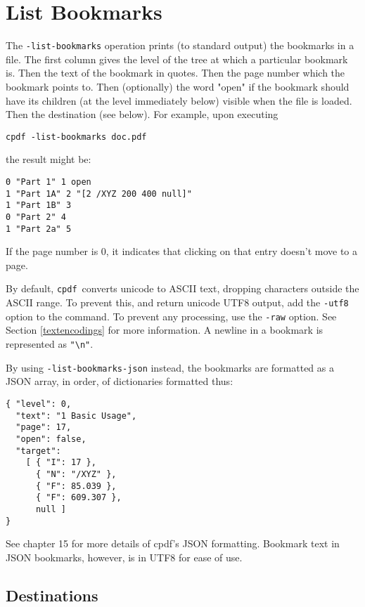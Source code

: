 \documentclass{book}
\newcommand{\cpdf}{\texttt{cpdf}}
\begin{document}
  \section{List Bookmarks}
  The \texttt{-list-bookmarks} operation prints (to standard output) the
bookmarks in a file. The first column gives the level of the tree at which a
particular bookmark is. Then the text of the bookmark in quotes. Then the page
number which the bookmark points to. Then (optionally) the word "open" if the
bookmark should have its children (at the level immediately below) visible when
the file is loaded. Then the destination (see below). For example, upon executing
\begin{framed}
  \small\verb!cpdf -list-bookmarks doc.pdf!
\end{framed}

\noindent the result might be:
\begin{framed}{\small\begin{verbatim}
0 "Part 1" 1 open
1 "Part 1A" 2 "[2 /XYZ 200 400 null]"
1 "Part 1B" 3
0 "Part 2" 4
1 "Part 2a" 5\end{verbatim}}\end{framed}
\noindent If the page number is 0, it indicates that clicking on that entry doesn't move to a page.

By default, \cpdf\ converts unicode to ASCII text, dropping characters outside
the ASCII range. To prevent this, and return unicode UTF8 output, add the
\texttt{-utf8} option to the command. To prevent any processing, use the
\texttt{-raw} option. See Section \ref{textencodings} for more information. A newline in a bookmark is represented as \texttt{"\textbackslash n"}.

By using \texttt{-list-bookmarks-json} instead, the bookmarks are formatted as a JSON array, in order, of dictionaries formatted thus:

\begin{verbatim}
{ "level": 0,
  "text": "1 Basic Usage",
  "page": 17,
  "open": false,
  "target":
    [ { "I": 17 },
      { "N": "/XYZ" },
      { "F": 85.039 },
      { "F": 609.307 },
      null ]
}
\end{verbatim}

See chapter 15 for more details of cpdf's JSON formatting. Bookmark text in JSON bookmarks, however, is in UTF8 for ease of use.

\subsection{Destinations}
\end{document}
